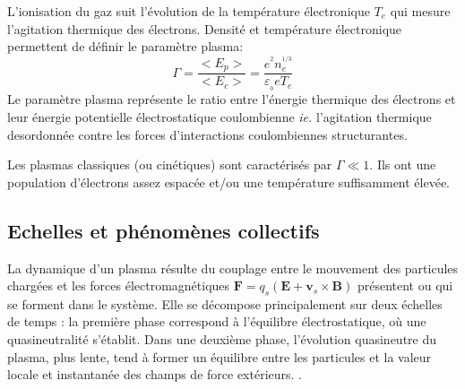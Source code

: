 			L'ionisation du gaz suit l'évolution de la température électronique $T_e$ qui
			mesure l'agitation thermique des électrons. Densité et température
			électronique permettent de définir le paramètre plasma:
			\begin{equation}
			\label{1-paramPlasma}
				\Gamma=\frac{<E_p>}{<E_c>}=\frac{e^{^2}n_e^{^{1/3}}}{\varepsilon_{_0}
				eT_e}
			\end{equation}
			Le paramètre plasma représente le ratio entre l'énergie thermique des
			électrons et leur énergie potentielle électrostatique coulombienne \emph{ie.}
			l'agitation thermique desordonnée contre les forces d'interactions
			coulombiennes structurantes. 
			
			Les plasmas classiques (ou cinétiques) sont caractérisés par
			$\Gamma\ll 1$. Ils ont une population d'électrons assez espacée et/ou une
			température suffisamment élevée.
			
		\subsection{Echelles et phénomènes collectifs}
		La dynamique d'un plasma résulte du couplage entre le mouvement des
		particules chargées et les forces électromagnétiques $\mathbf
		F=q_s(\mathbf E+ \mathbf v_s\times\mathbf B)$
		présentent ou qui se forment dans le système.
		Elle se décompose principalement sur deux échelles de temps : la première
		phase correspond à l'équilibre électrostatique, où une
		quasineutralité s'établit. Dans une deuxième phase, l'évolution quasineutre du
		plasma, plus lente, tend à former un équilibre entre les particules et la valeur locale 
		et instantanée des champs de force extérieurs.
		.
